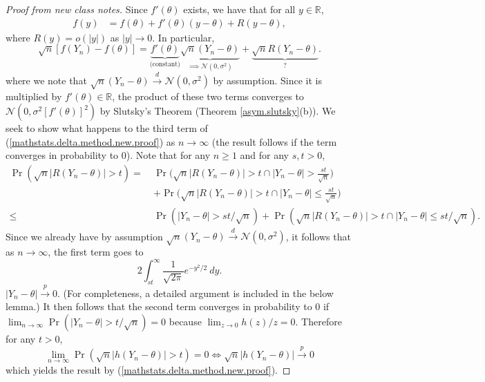 \begin{proof}[Proof from new class notes] Since \(f'(\theta)\) exists, we have that for all \(y \in \mathbb{R}\),
\begin{align*}
 f(y) & = f(\theta) + f'(\theta) (y - \theta) + R(y-\theta),
\end{align*}
where \(R(y) = o(|y|)\) as \(|y| \to 0\). In particular,
\begin{equation}\label{mathstats.delta.method.new.proof}
\sqrt{n}[f(Y_n) - f(\theta)]  =  \underbrace{f'(\theta)}_{\text{(constant)}} \underbrace{\sqrt{n} (Y_n - \theta)}_{\implies \mathcal{N}(0,\sigma^2)} + \underbrace{\sqrt{n}R(Y_n-\theta)}_{\text{?}}.
\end{equation}
where we note that \( \sqrt{n} (Y_n - \theta) \xrightarrow{d} \mathcal{N}(0,\sigma^2)\) by assumption. Since it is multiplied by \(f'(\theta) \in \mathbb{R}\), the product of these two terms converges to \(\mathcal{N}(0, \sigma^2 [f'(\theta)]^2)\) by Slutsky's Theorem (Theorem \ref{asym.slutsky}(b)).  We seek to show what happens to the third term of (\ref{mathstats.delta.method.new.proof}) as \(n \to \infty\) (the result follows if the term converges in probability to 0). Note that for any \(n \geq 1\) and for any \(s, t >0\),
\begin{align}
\Pr(\sqrt{n}|R(Y_n - \theta )| > t)  = ~ & \Pr \bigg(\sqrt{n}|R(Y_n - \theta)| > t \cap |Y_n - \theta | > \frac{st}{\sqrt{n}} \bigg) \nonumber
\\ & + \Pr \bigg(\sqrt{n}|R(Y_n - \theta )| > t \cap |Y_n - \theta | \leq \frac{st}{\sqrt{n}} \bigg) \nonumber
\\  \leq  ~ & \Pr( |Y_n - \theta | > st/\sqrt{n}) + \Pr(\sqrt{n}|R(Y_n - \theta )| > t \cap |Y_n - \theta | \leq st/\sqrt{n}). \label{mathstats.delta.method.new.proof.b}
\end{align}
Since we already have by assumption \( \sqrt{n} (Y_n - \theta) \xrightarrow{d} \mathcal{N}(0,\sigma^2)\), it follows that as \(n \to \infty\), the first term goes to
\[
2 \int_{st}^{\infty} \frac{1}{\sqrt{2 \pi}} e^{-y^2/2} \ dy.
\]
\(|Y_n - \theta |  \xrightarrow{p} 0 \). (For completeness, a detailed argument is included in the below lemma.) It then follows that the second term converges in probability to 0 if \(\lim_{n \to \infty} \Pr(|Y_n - \theta| > t/\sqrt{n}) = 0\) because \(\lim_{z \to 0} h(z)/z = 0\). Therefore for any \(t > 0\),
\[
\lim_{n \to \infty} \Pr(\sqrt{n}|h(Y_n - \theta )| > t)  = 0 \iff \sqrt{n}|h(Y_n - \theta )|  \xrightarrow{p}0
\]
which yields the result by (\ref{mathstats.delta.method.new.proof}).


\end{proof}

